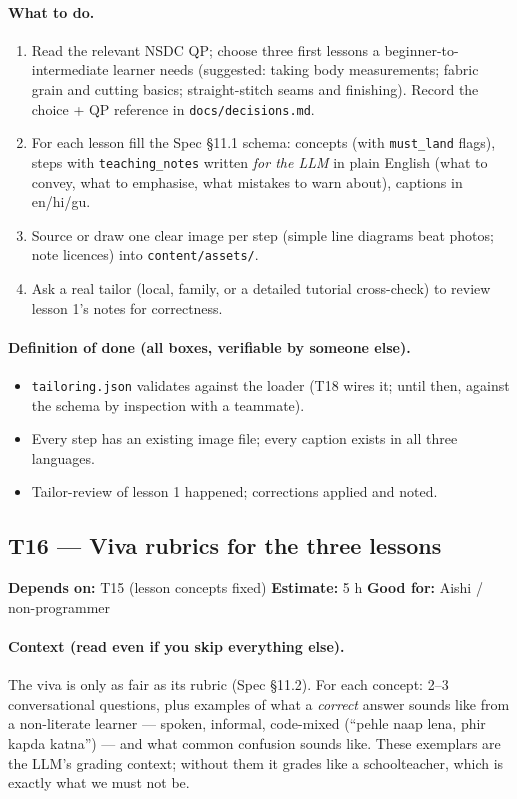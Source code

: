 \documentclass[11pt]{article}
\newcommand{\code}[1]{\texttt{#1}}
\newcommand{\taskmeta}[3]{\noindent\textbf{Depends on:} #1 \quad\textbullet\quad \textbf{Estimate:} #2 \quad\textbullet\quad \textbf{Good for:} #3\par\vspace{2pt}}
\newcommand{\ctx}[1]{\paragraph{Context (read even if you skip everything else).} #1}
\newcommand{\dod}{\paragraph{Definition of done (all boxes, verifiable by someone else).}}
\begin{document}
\paragraph{What to do.}
\begin{enumerate}
  \item Read the relevant NSDC QP; choose three first lessons a beginner-to-intermediate learner needs (suggested: taking body measurements; fabric grain and cutting basics; straight-stitch seams and finishing). Record the choice + QP reference in \code{docs/decisions.md}.
  \item For each lesson fill the Spec \S11.1 schema: concepts (with \code{must\_land} flags), steps with \code{teaching\_notes} written \emph{for the LLM} in plain English (what to convey, what to emphasise, what mistakes to warn about), captions in en/hi/gu.
  \item Source or draw one clear image per step (simple line diagrams beat photos; note licences) into \code{content/assets/}.
  \item Ask a real tailor (local, family, or a detailed tutorial cross-check) to review lesson 1's notes for correctness.
\end{enumerate}
\dod
\begin{itemize}
  \item \code{tailoring.json} validates against the loader (T18 wires it; until then, against the schema by inspection with a teammate).
  \item Every step has an existing image file; every caption exists in all three languages.
  \item Tailor-review of lesson 1 happened; corrections applied and noted.
\end{itemize}

\subsection{T16 --- Viva rubrics for the three lessons \dag}
\taskmeta{T15 (lesson concepts fixed)}{5 h}{Aishi / non-programmer}
\ctx{The viva is only as fair as its rubric (Spec \S11.2). For each concept: 2--3 conversational questions, plus examples of what a \emph{correct} answer sounds like from a non-literate learner --- spoken, informal, code-mixed (``pehle naap lena, phir kapda katna'') --- and what common confusion sounds like. These exemplars are the LLM's grading context; without them it grades like a schoolteacher, which is exactly what we must not be.}
\end{document}

